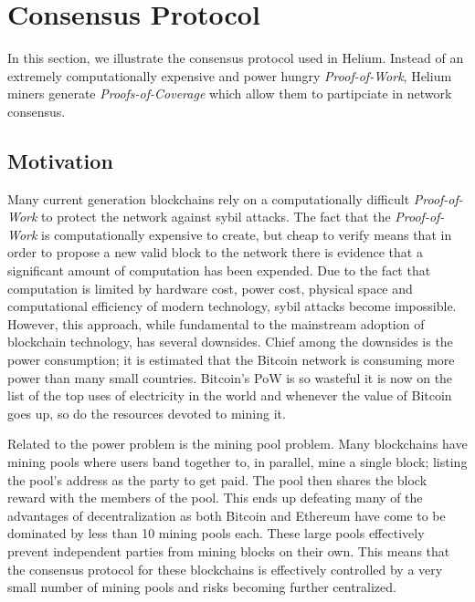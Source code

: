 \documentclass[UTF8, 10pt, nonatbib, nocopyrightspace, reprint]{sigplanconf}
\begin{document}
\begin{description}
\end{description}

\section{Consensus Protocol}\label{consensus}

In this section, we illustrate the consensus protocol used in Helium. Instead of an extremely computationally expensive and power hungry \emph{Proof-of-Work}, Helium miners generate \emph{Proofs-of-Coverage} which allow them to partipciate in network consensus.

\subsection{Motivation}

Many current generation blockchains rely on a computationally difficult \emph{Proof-of-Work} to protect the network against sybil attacks. The fact that the \emph{Proof-of-Work} is computationally expensive to create, but cheap to verify means that in order to propose a new valid block to the network there is evidence that a significant amount of computation has been expended. Due to the fact that computation is limited by hardware cost, power cost, physical space and computational efficiency of modern technology, sybil attacks become impossible. However, this approach, while fundamental to the mainstream adoption of blockchain technology, has several downsides. Chief among the downsides is the power consumption; it is estimated that the Bitcoin network is consuming more power than many small countries. Bitcoin's PoW is so wasteful it is now on the list of the top uses of electricity in the world and whenever the value of Bitcoin goes up, so do the resources devoted to mining it.

Related to the power problem is the mining pool problem. Many blockchains have mining pools where users band together to, in parallel, mine a single block; listing the pool's address as the party to get paid. The pool then shares the block reward with the members of the pool. This ends up defeating many of the advantages of decentralization as both Bitcoin and Ethereum have come to be dominated by less than 10 mining pools each. These large pools effectively prevent independent parties from mining blocks on their own. This means that the consensus protocol for these blockchains is effectively controlled by a very small number of mining pools and risks becoming further centralized.
\end{document}
